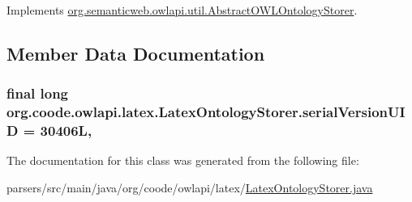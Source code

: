 Implements \hyperlink{classorg_1_1semanticweb_1_1owlapi_1_1util_1_1_abstract_o_w_l_ontology_storer_af2b614d520f12955394f4762a3542021}{org.\-semanticweb.\-owlapi.\-util.\-Abstract\-O\-W\-L\-Ontology\-Storer}.



\subsection{Member Data Documentation}
\hypertarget{classorg_1_1coode_1_1owlapi_1_1latex_1_1_latex_ontology_storer_a1f6d5c3052b5befaee6d3b60279e1461}{
\subsubsection[{serial\-Version\-U\-I\-D}]{\setlength{\rightskip}{0pt plus 5cm}final long org.\-coode.\-owlapi.\-latex.\-Latex\-Ontology\-Storer.\-serial\-Version\-U\-I\-D = 30406\-L\hspace{0.3cm}{\ttfamily [static]}, {\ttfamily [private]}}}\label{classorg_1_1coode_1_1owlapi_1_1latex_1_1_latex_ontology_storer_a1f6d5c3052b5befaee6d3b60279e1461}


The documentation for this class was generated from the following file\-:\begin{DoxyCompactItemize}
\item 
parsers/src/main/java/org/coode/owlapi/latex/\hyperlink{_latex_ontology_storer_8java}{Latex\-Ontology\-Storer.\-java}\end{DoxyCompactItemize}
